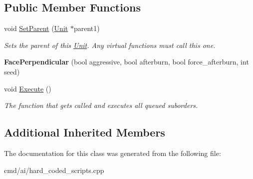 \subsection*{Public Member Functions}
\begin{DoxyCompactItemize}
\item 
void \hyperlink{classOrders_1_1FacePerpendicular_ac86f95dd51f26d785e357e76dbe16011}{Set\+Parent} (\hyperlink{classUnit}{Unit} $\ast$parent1)\hypertarget{classOrders_1_1FacePerpendicular_ac86f95dd51f26d785e357e76dbe16011}{}\label{classOrders_1_1FacePerpendicular_ac86f95dd51f26d785e357e76dbe16011}

\begin{DoxyCompactList}\small\item\em Sets the parent of this \hyperlink{classUnit}{Unit}. Any virtual functions must call this one. \end{DoxyCompactList}\item 
{\bfseries Face\+Perpendicular} (bool aggressive, bool afterburn, bool force\+\_\+afterburn, int seed)\hypertarget{classOrders_1_1FacePerpendicular_a9cf2f7562188b546b5cc8bf7fc6f7dba}{}\label{classOrders_1_1FacePerpendicular_a9cf2f7562188b546b5cc8bf7fc6f7dba}

\item 
void \hyperlink{classOrders_1_1FacePerpendicular_af83473b27b43c0aa5fafafb558f08bc4}{Execute} ()\hypertarget{classOrders_1_1FacePerpendicular_af83473b27b43c0aa5fafafb558f08bc4}{}\label{classOrders_1_1FacePerpendicular_af83473b27b43c0aa5fafafb558f08bc4}

\begin{DoxyCompactList}\small\item\em The function that gets called and executes all queued suborders. \end{DoxyCompactList}\end{DoxyCompactItemize}
\subsection*{Additional Inherited Members}


The documentation for this class was generated from the following file\+:\begin{DoxyCompactItemize}
\item 
cmd/ai/hard\+\_\+coded\+\_\+scripts.\+cpp\end{DoxyCompactItemize}
